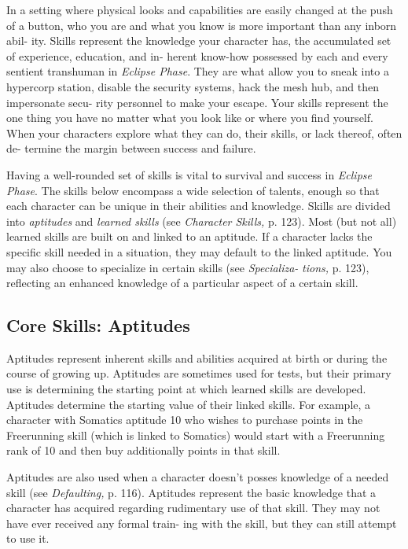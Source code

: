 In a setting where physical looks and capabilities are 
easily changed at the push of a button, who you are and 
what you know is more important than any inborn abil-
ity. Skills represent the knowledge your character has, 
the accumulated set of experience, education, and in-
herent know-how possessed by each and every sentient 
transhuman in \textit{Eclipse Phase}. They are what allow you 
to sneak into a hypercorp station, disable the security 
systems, hack the mesh hub, and then impersonate secu-
rity personnel to make your escape. Your skills represent 
the one thing you have no matter what you look like or 
where you find yourself. When your characters explore 
what they can do, their skills, or lack thereof, often de-
termine the margin between success and failure.

Having a well-rounded set of skills is vital to survival 
and success in \textit{Eclipse Phase}. The skills below encompass 
a wide selection of talents, enough so that each character 
can be unique in their abilities and knowledge.
Skills are divided into \textit{aptitudes} and \textit{learned skills }(see 
\textit{Character Skills,} p. 123). Most (but not all) learned 
skills are built on and linked to an aptitude. If a 
character lacks the specific skill needed in a situation, 
they may default to the linked aptitude. You may also 
choose to specialize in certain skills (see \textit{Specializa-}
\textit{tions,} p. 123), reflecting an enhanced knowledge of a 
particular aspect of a certain skill.

\subsection{Core Skills: Aptitudes}

Aptitudes represent inherent skills and abilities acquired 
at birth or during the course of growing up. Aptitudes 
are sometimes used for tests, but their primary use is 
determining the starting point at which learned skills 
are developed. Aptitudes determine the starting value 
of their linked skills. For example, a character with 
Somatics aptitude 10 who wishes to purchase points 
in the Freerunning skill (which is linked to Somatics) 
would start with a Freerunning rank of 10 and then 
buy additionally points in that skill.

Aptitudes are also used when a character doesn't 
posses knowledge of a needed skill (see \textit{Defaulting,} p. 
116). Aptitudes represent the basic knowledge that a 
character has acquired regarding rudimentary use of that 
skill. They may not have ever received any formal train-
ing with the skill, but they can still attempt to use it.

